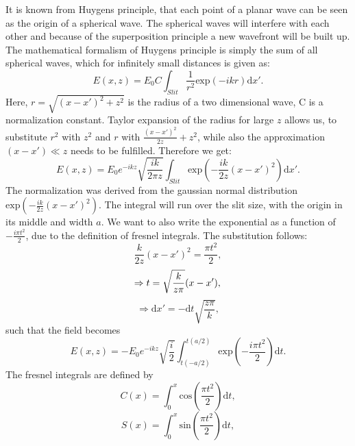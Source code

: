 It is known from Huygens principle, that each point of a planar wave can be seen as the origin of a spherical wave. The spherical waves will interfere with each other and because of the superposition principle a new wavefront will be built up.
The mathematical formalism of Huygens principle is simply the sum of all spherical waves, which for infinitely small distances is given as\cite{Steck2012}:
\begin{equation}
E(x,z) = E_0 C \int_{Slit} \frac{1}{r^2} \mathrm{exp}(-ikr)\mathrm{d}x'.
\end{equation}
Here, $r=\sqrt{(x-x')^2 + z^2}$ is the radius of a two dimensional wave, C is a normalization constant.
Taylor expansion of the radius for large $z$ allows us, to substitute $r^2$ with $z^2$ and $r$ with $\frac{(x-x')^2}{2z} + z^2$, while also the approximation $(x-x') \ll z$ needs to be fulfilled. Therefore we get:
\begin{equation}
E(x,z) = E_0 e^{-ikz}\sqrt{\frac{ik}{2\pi z}}\int_{Slit} \mathrm{exp}\left( -\frac{ik}{2z}(x-x')^2\right) \mathrm{d}x'.
\end{equation}
The normalization was derived from the gaussian normal distribution $\mathrm{exp}( -\frac{ik}{2z}(x-x')^2)$. The integral will run over the slit size, with the origin in its middle and width $a$.
We want to also write the exponential as a function of $-\frac{i\pi t^2}{2}$, due to the definition of fresnel integrals. The substitution follows:
\begin{equation}
\frac{k}{2z}(x-x')^2 = \frac{\pi t^2}{2},
\end{equation}
\begin{equation}
\Rightarrow t = \sqrt{\frac{k}{z\pi}}(x-x'), \\
\end{equation}
\begin{equation}
\Rightarrow \mathrm{d}x' = -\mathrm{d}t \sqrt{\frac{z\pi}{k}},
\end{equation}
such that the field becomes
\begin{equation}
E(x,z) = -E_0 e^{-ikz}\sqrt{\frac{i}{2}}\int_{t(-a/2)}^{t(a/2)} \mathrm{exp}\left( -\frac{i\pi t^2}{2}\right) \mathrm{d}t.
\end{equation}
The fresnel integrals are defined by
\begin{equation}
C(x) = \int_0^x \mathrm{cos}\left(\frac{\pi t^2}{2}\right)\mathrm{d}t,
\end{equation}
\begin{equation}
S(x) = \int_0^x \mathrm{sin}\left(\frac{\pi t^2}{2}\right)\mathrm{d}t,
\end{equation}

